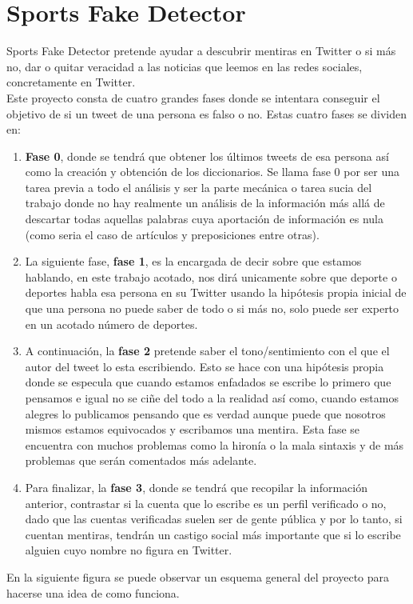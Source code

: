 \documentclass[../all.tex]{subfiles}
\begin{document}
    \section{Sports Fake Detector}
	
	Sports Fake Detector pretende ayudar a descubrir mentiras en Twitter o si más no, dar o quitar veracidad a las noticias que leemos en las redes sociales, concretamente en Twitter.\\
	
	Este proyecto consta de cuatro grandes fases donde se intentara conseguir el objetivo de si un tweet de una persona es falso o no. Estas cuatro fases se dividen en:
	
	\begin{enumerate}
		\item \textbf{Fase 0}, donde se tendrá que obtener  los últimos tweets de esa persona así como la creación y obtención de los diccionarios. Se llama fase 0 por ser una tarea previa  a todo el análisis y ser la parte mecánica o tarea sucia del trabajo donde no hay realmente un análisis de la información más allá de descartar todas aquellas palabras cuya aportación de información es nula (como seria el caso de artículos y preposiciones entre otras).
		
		\item La siguiente fase, \textbf{fase 1}, es la encargada de decir sobre que estamos hablando, en este trabajo acotado, nos dirá unicamente sobre que deporte o deportes habla esa persona en su Twitter usando la hipótesis propia inicial de que una persona no puede saber de todo o si más no, solo puede ser experto en un acotado número de deportes.
		
		\item A continuación, la \textbf{fase 2} pretende saber el tono/sentimiento con el que el autor del tweet lo esta escribiendo. Esto se hace con una hipótesis propia donde se especula que cuando estamos enfadados se escribe lo primero que pensamos e igual no se ciñe del todo a la realidad así como, cuando estamos alegres lo publicamos pensando que es verdad aunque puede que nosotros mismos estamos equivocados y escribamos una mentira. Esta fase se encuentra con muchos problemas como la hironía o la mala sintaxis y de más problemas que serán comentados más adelante.
		
		\item Para finalizar, la \textbf{fase 3}, donde se tendrá que recopilar la información anterior, contrastar si la cuenta que lo escribe es un perfil verificado o no, dado que las cuentas verificadas suelen ser de gente pública y por lo tanto, si cuentan mentiras, tendrán un castigo social más importante que si lo escribe alguien cuyo nombre no figura en Twitter. 
		
	\end{enumerate}
	\newpage
	En la siguiente figura se puede observar un esquema general del proyecto para hacerse una idea de como funciona.
	
\end{document}

